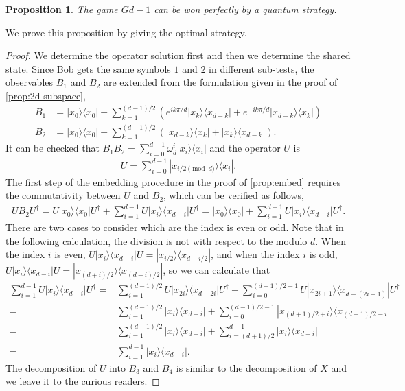 \documentclass[11pt,letterpaper]{article}
\newcommand{\ketbra}[2]{|#1\rangle\langle#2|}
\newcommand{\ct}{^{\dagger}}
\newcommand{\1}{\mathbb{1}}
\newcommand{\G}{G}
\newtheorem{proposition}[theorem]{Proposition}
\theoremstyle{definition}
\begin{document}
\begin{proposition}
	The game $\G{d-1}$ can be won perfectly by a quantum strategy.
\end{proposition}
We prove this proposition by giving the optimal strategy.
\begin{proof}
We determine the operator solution first and then we determine the shared state.
Since Bob gets the same symbols $1$ and $2$ in different sub-tests, 
the observables $B_1$ and $B_2$ are extended from the formulation given in the proof
of \cref{prop:2d-subspace},
\begin{align}
	B_1 &= \ketbra{x_0}{x_0} + 
	\sum_{k=1}^{(d-1)/2}\left( e^{ik\pi/d}\ketbra{x_k}{x_{d-k}} + e^{-ik\pi/d}\ketbra{x_{d-k}}{x_k}\right)\\
	B_2 &= \ketbra{x_0}{x_0} + 
	\sum_{k=1}^{(d-1)/2}\left(\ketbra{x_{d-k}}{x_k} + \ketbra{x_k}{x_{d-k}}\right).
\end{align}
It can be checked that $B_1B_2 = \sum_{i=0}^{d-1} \omega_d^i \ketbra{x_i}{x_i}$ and the operator $U$ is
\begin{align}
	U = \sum_{i=0}^{d-1} \ketbra{x_{i/2 \pmod{d}}}{x_i}.
\end{align}
The first step of the embedding procedure in the proof of \cref{prop:embed} requires
the commutativity between $U$ and $B_2$, which can be verified as follows,
\begin{align}
	UB_2U\ct = U\ketbra{x_0}{x_0}U\ct + \sum_{i=1}^{d-1} U\ketbra{x_i}{x_{d-i}}U\ct 
	= \ketbra{x_0}{x_0} + \sum_{i=1}^{d-1} U\ketbra{x_i}{x_{d-i}}U\ct.
\end{align}
There are two cases to consider which are the index is even or odd.
Note that in the following calculation, the division is not with respect to the modulo $d$.
When the index $i$ is even, $U\ketbra{x_i}{x_{d-i}}U = \ketbra{x_{i/2}}{x_{d-i/2}}$, and
when the index $i$ is odd, $U\ketbra{x_i}{x_{d-i}}U = \ketbra{x_{(d+i)/2}}{x_{(d-i)/2}}$,
so we can calculate that 
\begin{align}
	\sum_{i=1}^{d-1} U\ketbra{x_i}{x_{d-i}}U\ct 
	=& \sum_{i=1}^{(d-1)/2}U\ketbra{x_{2i}}{x_{d-2i}}U\ct 
	+ \sum_{i=0}^{(d-1)/2-1} U\ketbra{x_{2i+1}}{x_{d-(2i+1)}}U\ct\\
	=& \sum_{i=1}^{(d-1)/2}\ketbra{x_i}{x_{d-i}} + \sum_{i=0}^{(d-1)/2-1} \ketbra{x_{(d+1)/2+i}}{x_{(d-1)/2-i}}\\
	=& \sum_{i=1}^{(d-1)/2}\ketbra{x_i}{x_{d-i}} + \sum_{i=(d+1)/2}^{d-1} \ketbra{x_i}{x_{d-i}}\\
	=&\sum_{i=1}^{d-1} \ketbra{x_i}{x_{d-i}}.
\end{align}
The decomposition of $U$ into $B_3$ and $B_4$ is similar to the decomposition of $X$ and we leave it to the curious 
readers.


\end{proof}
\end{document}
